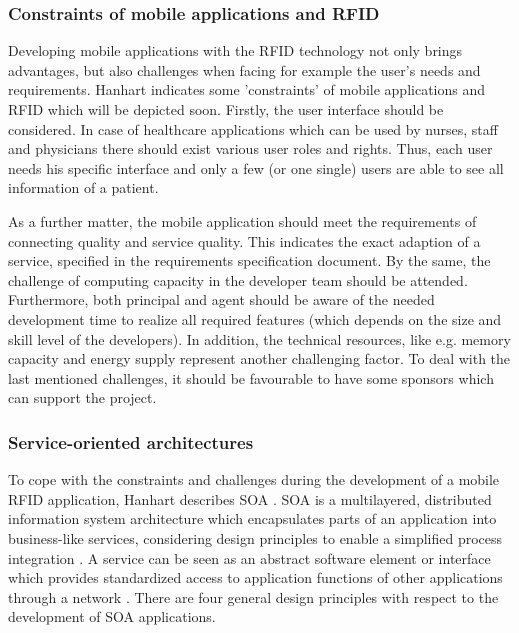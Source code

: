 \subsubsection{Constraints of mobile applications and RFID}

Developing mobile applications with the RFID technology not only brings advantages, but also challenges when facing for example the user's needs and requirements. Hanhart indicates some 'constraints' of mobile applications and RFID \cite[p.16 ff.]{mobile} which will be depicted soon. Firstly, the user interface should be considered. In case of healthcare applications which can be used by nurses, staff and physicians there should exist various user roles and rights. Thus, each user needs his specific interface and only a few (or one single) users are able to see all information of a patient. 

As a further matter, the mobile application should meet the requirements of connecting quality and service quality. This indicates the exact adaption of a service, specified in the requirements specification document. By the same, the challenge of computing capacity in the developer team should be attended. Furthermore, both principal and agent should be aware of the needed development time to realize all required features (which depends on the size and skill level of the developers). In addition, the technical resources, like e.g. memory capacity and energy supply represent another challenging factor. To deal with the last mentioned challenges, it should be favourable to have some sponsors which can support the project.

\subsubsection{Service-oriented architectures}

To cope with the constraints and challenges during the development of a mobile RFID application, Hanhart describes \ac{SOA} \cite[p.31 ff.]{mobile}. SOA is a multilayered, distributed information system architecture which encapsulates parts of an application into business-like services, considering design principles to enable a simplified process integration \cite[p.32]{mobile}. A service can be seen as an abstract software element or interface which provides standardized access to application functions of other applications through a network \cite[p.32]{mobile}. There are four general design principles with respect to the development of SOA applications. 

